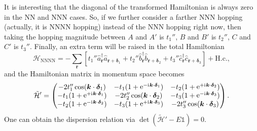\documentclass[ preprint, numerical, superscriptaddress, svgnames,
                amssymb, aps, prb ]{revtex4-2}
\DeclareRobustCommand \iu {\mathrm i\mkern1mu}
\DeclareMathOperator \upe {e}
\renewcommand *\theequation{\arabic{section}.\arabic{equation}}
\begin{document}
It is interesting that the diagonal of the transformed Hamiltonian is always
zero in the NN and NNN cases. So, if we further consider a farther NNN hopping
(actually, it is NNNN hopping) instead of the NNN hopping right now,
then taking the hopping magnitude between $A$ and
$A'$ is $t_1''$, $B$ and $B'$ is $t_2''$, $C$ and $C'$ is $t_3''$.
Finally, an extra term will be raised in the total Hamiltonian
\begin{equation}
  \mathcal H_\text{NNNN} = -\sum_{\bm r}[
    t_1'' \hat a_{\bm r}^\dagger \hat a_{\bm r+\bm\delta_1}
  + t_2'' \hat b_{\bm r}^\dagger \hat b_{\bm r+\bm\delta_2}
  + t_3'' \hat c_{\bm r}^\dagger \hat c_{\bm r+\bm\delta_3}] + \text{H.c.},
\end{equation}
and the Hamiltonian matrix in momentum space becomes
\begin{equation}
  \tilde{\mathcal H}' =
  \begin{pmatrix}
    -2t_1''\cos(\bm k \cdot \bm \delta_1) &
    -t_1(1 + \upe^{-\iu\bm k\cdot\bm\delta_1}) &
    -t_2(1 + \upe^{+\iu\bm k\cdot\bm\delta_2})\\
    -t_1(1 + \upe^{+\iu\bm k\cdot\bm\delta_1}) &
    -2t_2''\cos(\bm k \cdot \bm \delta_2) &
    -t_3(1 + \upe^{-\iu\bm k\cdot\bm\delta_3})\\
    -t_2(1 + \upe^{-\iu\bm k\cdot\bm\delta_2}) &
    -t_3(1 + \upe^{+\iu\bm k\cdot\bm\delta_3}) &
    -2t_3'' \cos(\bm k \cdot \bm \delta_3)
  \end{pmatrix}.
\end{equation}
One can obtain the dispersion relation
via $\det(\tilde{\mathcal H}' - E\mathds 1) = 0$.


\end{document}
